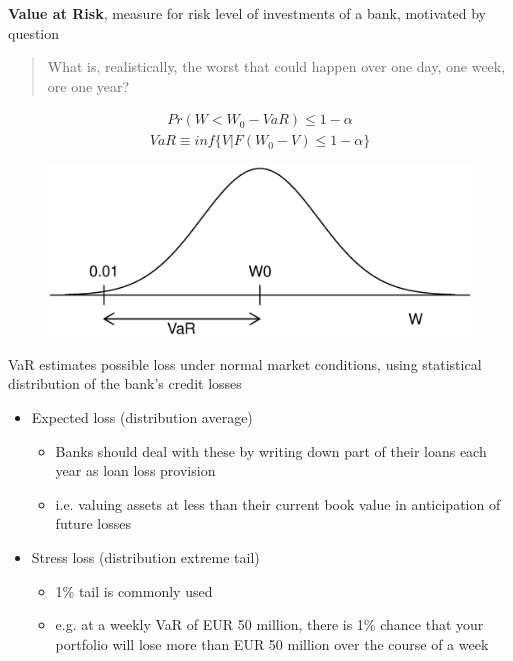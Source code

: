 \documentclass{beamer}
\begin{document}
\begin{frame} 
  \textbf{Value at Risk}, measure for risk level of investments of a bank, motivated by question
  \begin{quote}
    What is, realistically, the worst that could happen over one day, one week, ore one year?
  \end{quote}
  \begin{align}
    Pr(W<W_0-VaR)\leq 1-\alpha
  \end{align}
  \begin{align}
    VaR \equiv inf\{V|F(W_0-V)\leq1-\alpha\}
  \end{align}
\end{frame}

\begin{frame}
  \begin{figure}
    \includegraphics[scale=.3]{VaR.eps}
  \end{figure}
\end{frame}


\begin{frame}
  VaR estimates possible loss under normal market conditions, using statistical distribution of the bank's credit losses
\begin{itemize}
  \item Expected loss (distribution average) 
  \begin{itemize}
    \item Banks should deal with these by writing down part of their loans each year as loan loss provision
    \item i.e. valuing assets at less than their current book value in anticipation of future losses
  \end{itemize}
  \medskip
  \item Stress loss (distribution extreme tail)
  \begin{itemize}
    \item 1\% tail is commonly used
    \item e.g. at a weekly VaR of EUR 50 million, there is  1\% chance that your portfolio will lose more than EUR 50 million over the course of a week 
  \end{itemize}
\end{itemize}
\end{frame}
\end{document}
